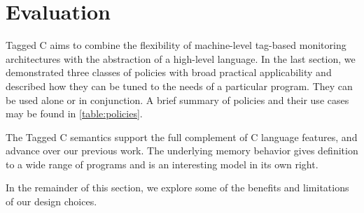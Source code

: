 \documentclass{llncs}
\begin{document}
\section{Evaluation}
\label{sec:evaluation}

Tagged C aims to combine the flexibility of machine-level tag-based monitoring architectures with the abstraction
of a high-level language. In the last section, we demonstrated three classes of policies
with broad practical applicability and described how they can be tuned to the needs of a
particular program. They can be used alone or in conjunction. A brief summary of
policies and their use cases may be found in \cref{table:policies}.

The Tagged C semantics support the full complement of C language features, and advance
over our previous work. The underlying memory behavior gives definition to a wide range
of programs and is an interesting model in its own right.

In the remainder of this section, we explore some of the benefits and limitations of
our design choices.


  
\end{document}
